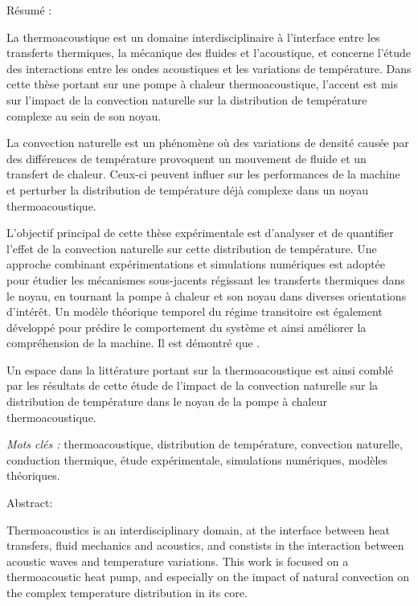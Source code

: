 {

\vfill

{\Large Résumé :}\medskip
\begin{multicols}{2}
La thermoacoustique est un domaine interdisciplinaire à l'interface entre les transferts thermiques, la mécanique des fluides et l'acoustique, et concerne l'étude des interactions entre les ondes acoustiques et les variations de température. Dans cette thèse portant sur une pompe à chaleur thermoacoustique, l'accent est mis sur l'impact de la convection naturelle sur la distribution de température complexe au sein de son noyau.

La convection naturelle est un phénomène où des variations de densité causée par des différences de température provoquent un mouvement de fluide et un transfert de chaleur. Ceux-ci peuvent influer sur les performances de la machine et  perturber la distribution de température déjà complexe dans un noyau thermoacoustique.

L'objectif principal de cette thèse expérimentale est d'analyser et de quantifier l'effet de la convection naturelle sur cette distribution de température. Une approche combinant expérimentations et simulations numériques est adoptée pour étudier les mécanismes sous-jacents régissant les transferts thermiques dans le noyau, en tournant la pompe à chaleur et son noyau dans diverses orientations d'intérêt. Un modèle théorique temporel du régime transitoire est également développé pour prédire le comportement du système et ainsi améliorer la compréhension de la machine. Il est démontré que .

Un espace dans la littérature portant sur la thermoacoustique est ainsi comblé par les résultats de cette étude de l'impact de la convection naturelle sur la distribution de température dans le noyau de la pompe à chaleur thermoacoustique.
\end{multicols}
\bigskip

{\large \textit{Mots clés :}} thermoacoustique,  distribution de température, convection naturelle, conduction thermique, étude expérimentale, simulations numériques, modèles théoriques.

\vfill

{\Large Abstract:}\medskip
\begin{multicols}{2}
Thermoacoustics is an interdisciplinary domain, at the interface between heat transfers, fluid mechanics and acoustics, and constists in the interaction between acoustic waves and temperature variations. This work is focused on a thermoacoustic heat pump, and especially on the impact of natural convection on the complex temperature distribution in its core.


\end{multicols}}
